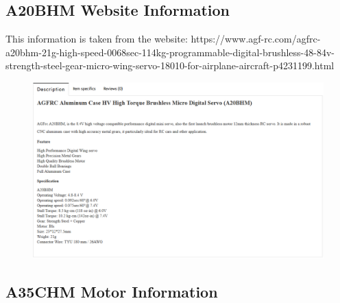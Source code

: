 \subsection{A20BHM Website Information}
\label{appendix:A20_info}

This information is taken from the website: \newline    
https://www.agf-rc.com/agfrc-a20bhm-21g-high-speed-0068sec-114kg-programmable-digital-brushless-48-84v-strength-steel-gear-micro-wing-servo-18010-for-airplane-aircraft-p4231199.html
\begin{figure}[H]
    \centering
    \includegraphics[width=\textwidth]{Images/A20_info.png}
    \label{fig:A20_info}
\end{figure}

\subsection{A35CHM Motor Information}
\label{appendix:A35CHM_motor_info}

